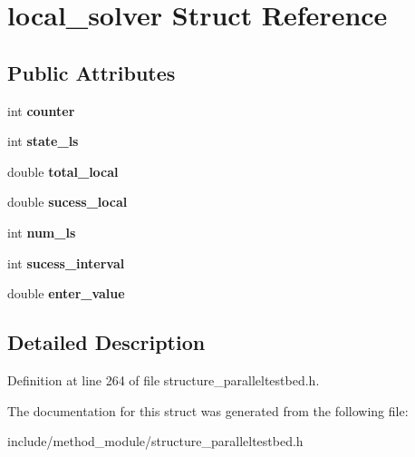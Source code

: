 \hypertarget{structlocal__solver}{\section{local\-\_\-solver Struct Reference}
\label{structlocal__solver}
}
\subsection*{Public Attributes}
\begin{DoxyCompactItemize}
\item 
\hypertarget{structlocal__solver_a617ee88ad5fb73eda9dd034e2bb4a741}{int {\bfseries counter}}\label{structlocal__solver_a617ee88ad5fb73eda9dd034e2bb4a741}

\item 
\hypertarget{structlocal__solver_acc0d0ceac72f461f40f3b977a038cefe}{int {\bfseries state\-\_\-ls}}\label{structlocal__solver_acc0d0ceac72f461f40f3b977a038cefe}

\item 
\hypertarget{structlocal__solver_a01a3d1f2811fae189976ba9b983622ef}{double {\bfseries total\-\_\-local}}\label{structlocal__solver_a01a3d1f2811fae189976ba9b983622ef}

\item 
\hypertarget{structlocal__solver_a574a8d6de534f4724f09aabbc06f16ca}{double {\bfseries sucess\-\_\-local}}\label{structlocal__solver_a574a8d6de534f4724f09aabbc06f16ca}

\item 
\hypertarget{structlocal__solver_ae50275189c2fb138294c606c208a2bca}{int {\bfseries num\-\_\-ls}}\label{structlocal__solver_ae50275189c2fb138294c606c208a2bca}

\item 
\hypertarget{structlocal__solver_a338cd69e13fbe81fad8d4215bc755a86}{int {\bfseries sucess\-\_\-interval}}\label{structlocal__solver_a338cd69e13fbe81fad8d4215bc755a86}

\item 
\hypertarget{structlocal__solver_a3f16a4ec14e4a06d3ff839883157f875}{double {\bfseries enter\-\_\-value}}\label{structlocal__solver_a3f16a4ec14e4a06d3ff839883157f875}

\end{DoxyCompactItemize}


\subsection{Detailed Description}


Definition at line 264 of file structure\-\_\-paralleltestbed.\-h.



The documentation for this struct was generated from the following file\-:\begin{DoxyCompactItemize}
\item 
include/method\-\_\-module/structure\-\_\-paralleltestbed.\-h\end{DoxyCompactItemize}
